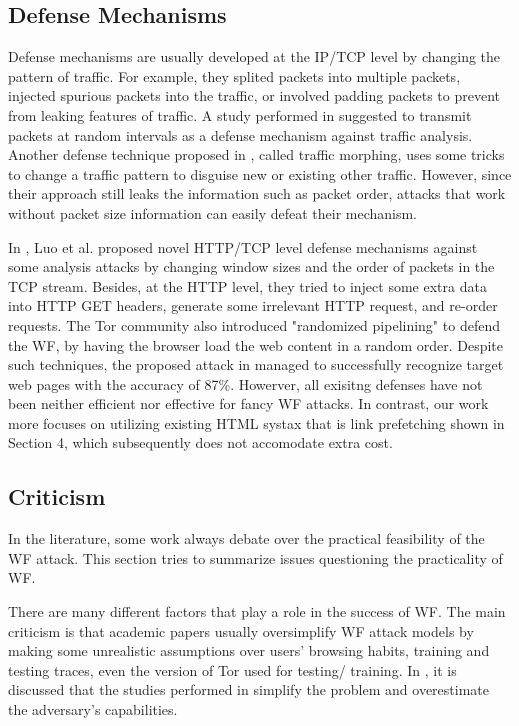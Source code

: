 \subsection{Defense Mechanisms}
Defense mechanisms are usually developed at the IP/TCP level by changing the pattern of traffic. For example, they splited packets into multiple packets, injected spurious packets into the traffic, or involved  padding packets to prevent from leaking features of traffic. A study performed in \cite{fu2003} suggested to transmit packets at random intervals as a defense mechanism against traffic analysis. Another defense technique proposed in \cite{wright2009}, called traffic morphing, uses some tricks to change a traffic pattern to disguise new or existing other traffic. However, since their approach still leaks the information such as packet order, attacks that work without packet size information can easily defeat their mechanism.

In \cite{luo2011}, Luo et al. proposed novel HTTP/TCP level defense mechanisms against some analysis attacks by changing window sizes and the order of packets in the TCP stream. Besides, at the HTTP level, they tried to inject some extra data into HTTP GET headers, generate some irrelevant HTTP request, and re-order requests. The Tor community also introduced "randomized pipelining" \cite{perry11} to defend the WF, by having the browser load the web content in a random order. Despite such techniques, the proposed attack in \cite{cai2012touching} managed to successfully recognize target web pages with the accuracy of 87\%. 
Howerver, all exisitng defenses have not been neither efficient nor effective for fancy WF attacks. %
In contrast, our work more focuses on utilizing existing HTML systax that is link prefetching shown in Section 4, which subsequently does not accomodate extra cost.

\subsection{Criticism}
In the literature, some work always debate over the practical feasibility of the WF attack. This section tries to summarize issues questioning the practicality of WF.

There are many different factors that play a role in the success of WF. The main criticism is that academic papers usually oversimplify WF attack models by making some unrealistic assumptions over users' browsing habits, training and testing traces, even the version of Tor used for testing/ training. In \cite{juarez14}, it is discussed that the studies performed in \cite{cai2012touching, herrmann2009, panchenko11, wang2013improved, shi2009} simplify the problem and overestimate the adversary's capabilities.

